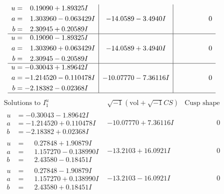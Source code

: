 \documentclass[1p]{elsarticle_modified}
\theoremstyle{definition}
\newcommand{\I}{\sqrt{-1}}
\begin{document}
$$\begin{array}{c|c|c}
\begin{aligned}
u &= \phantom{-}0.19090 + 1.89325 I \\
a &= \phantom{-}1.303960 - 0.063429 I \\
b &= \phantom{-}2.30945 + 0.20589 I\end{aligned}
 & -14.0589 - 3.4940 I & \phantom{-0.000000 } 0 \\ \hline\begin{aligned}
u &= \phantom{-}0.19090 - 1.89325 I \\
a &= \phantom{-}1.303960 + 0.063429 I \\
b &= \phantom{-}2.30945 - 0.20589 I\end{aligned}
 & -14.0589 + 3.4940 I & \phantom{-0.000000 } 0 \\ \hline\begin{aligned}
u &= -0.30043 + 1.89642 I \\
a &= -1.214520 - 0.110478 I \\
b &= -2.18382 - 0.02368 I\end{aligned}
 & -10.07770 - 7.36116 I & \phantom{-0.000000 } 0\\
 \hline 
 \end{array}$$\newpage$$\begin{array}{c|c|c}  
\text{Solutions to }I^u_{1}& \I (\text{vol} + \sqrt{-1}CS) & \text{Cusp shape}\\
 \hline 
\begin{aligned}
u &= -0.30043 - 1.89642 I \\
a &= -1.214520 + 0.110478 I \\
b &= -2.18382 + 0.02368 I\end{aligned}
 & -10.07770 + 7.36116 I & \phantom{-0.000000 } 0 \\ \hline\begin{aligned}
u &= \phantom{-}0.27848 + 1.90879 I \\
a &= \phantom{-}1.157270 - 0.138990 I \\
b &= \phantom{-}2.43580 - 0.18451 I\end{aligned}
 & -13.2103 + 16.0921 I & \phantom{-0.000000 } 0 \\ \hline\begin{aligned}
u &= \phantom{-}0.27848 - 1.90879 I \\
a &= \phantom{-}1.157270 + 0.138990 I \\
b &= \phantom{-}2.43580 + 0.18451 I\end{aligned}
 & -13.2103 - 16.0921 I & \phantom{-0.000000 } 0 \\ \hline\begin{aligned}

\end{aligned}
\end{array}$$
\end{document}
